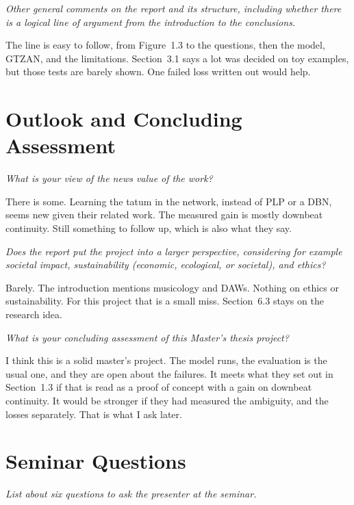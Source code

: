\documentclass[11pt,a4paper]{article}
\newcommand{\prompt}[1]{%
  \par\medskip
  \noindent\textit{#1}%
  \par\smallskip
}
\begin{document}
\prompt{Other general comments on the report and its structure, including whether there is a logical line of argument from the introduction to the conclusions.}

The line is easy to follow, from Figure~1.3 to the questions, then the model, GTZAN, and the limitations. Section~3.1 says a lot was decided on toy examples, but those tests are barely shown. One failed loss written out would help.

\section{Outlook and Concluding Assessment}

\prompt{What is your view of the news value of the work?}

There is some. Learning the tatum in the network, instead of PLP or a DBN, seems new given their related work. The measured gain is mostly downbeat continuity. Still something to follow up, which is also what they say.

\prompt{Does the report put the project into a larger perspective, considering for example societal impact, sustainability (economic, ecological, or societal), and ethics?}

Barely. The introduction mentions musicology and DAWs. Nothing on ethics or sustainability. For this project that is a small miss. Section~6.3 stays on the research idea.

\prompt{What is your concluding assessment of this Master's thesis project?}

I think this is a solid master's project. The model runs, the evaluation is the usual one, and they are open about the failures. It meets what they set out in Section~1.3 if that is read as a proof of concept with a gain on downbeat continuity. It would be stronger if they had measured the ambiguity, and the losses separately. That is what I ask later.

\newpage
\section{Seminar Questions}
\label{sec:questions}

\prompt{List about six questions to ask the presenter at the seminar.}
\end{document}
